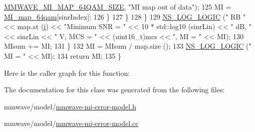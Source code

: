 \begin{DoxyCode}
      \hyperlink{namespacens3_a693bce071814cd94149a8f263633e038}{MMWAVE\_MI\_MAP\_64QAM\_SIZE}, \textcolor{stringliteral}{"MI map out of data"});
125                   MI = \hyperlink{namespacens3_addf441339cfdc6e9de9389d58269c19a}{MI\_map\_64qam}[sinrIndex];
126                 \}
127             \}
128         \}
129       \hyperlink{group__logging_ga88acd260151caf2db9c0fc84997f45ce}{NS\_LOG\_LOGIC} (\textcolor{stringliteral}{" RB "} << map.at (\hyperlink{bernuolliDistribution_8m_a6f6ccfcf58b31cb6412107d9d5281426}{i}) << \textcolor{stringliteral}{"Minimum SNR = "} << 10 * std::log10 (sinrLin) << \textcolor{stringliteral}{"
       dB, "} << sinrLin << \textcolor{stringliteral}{" V, MCS = "} << (uint16\_t)mcs << \textcolor{stringliteral}{", MI = "} << MI);
130       MIsum += MI;
131     \}
132   MI = MIsum / map.size ();
133   \hyperlink{group__logging_ga88acd260151caf2db9c0fc84997f45ce}{NS\_LOG\_LOGIC} (\textcolor{stringliteral}{" MI = "} << MI);
134   \textcolor{keywordflow}{return} MI;
135 \}
\end{DoxyCode}


Here is the caller graph for this function\+:




The documentation for this class was generated from the following files\+:\begin{DoxyCompactItemize}
\item 
mmwave/model/\hyperlink{mmwave-mi-error-model_8h}{mmwave-\/mi-\/error-\/model.\+h}\item 
mmwave/model/\hyperlink{mmwave-mi-error-model_8cc}{mmwave-\/mi-\/error-\/model.\+cc}\end{DoxyCompactItemize}
